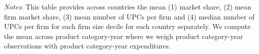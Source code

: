 \begin{table}[H]
	\centering		
	\caption{Size distribution by Decile}
    \label{tab: app_bars_firms_size_decile}
	\begin{spacing}{1.1}
    \end{spacing}
    \parbox{\textwidth}{
        \begin{spacing}{1} 
            {\footnotesize 
            \textit{Notes}: This table provides across countries the mean (1) market share, (2) mean firm market share, (3) mean number of UPCs per firm and (4) median number of UPCs per firm for each firm size decile for each country separately. We compute the mean across product category-year where we weigh product category-year observations with product category-year expenditures. }
        \end{spacing}}
\end{table}

